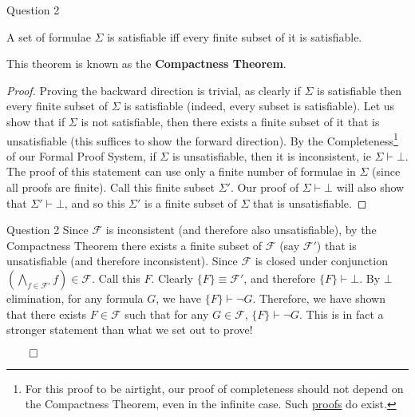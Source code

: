 \documentclass{beamer}
\begin{document}
    {
        \begin{frame}{Question 2}
            \vspace*{-4pt}
            \begin{theorem}
                A set of formulae $\Sigma$ is satisfiable iff every finite subset of it is satisfiable. 
            \end{theorem}
            \vspace*{-4pt}
            This theorem is known as the \textbf{Compactness Theorem}.
            \vspace*{-4pt}
            \begin{proof}
                Proving the backward direction is trivial, as clearly if $\Sigma$ is satisfiable then every finite subset of $\Sigma$ is satisfiable (indeed, every subset is satisfiable). Let us show that if $\Sigma$ is not satisfiable, then there exists a finite subset of it that is unsatisfiable (this suffices to show the forward direction). By the Completeness\footnote{For this proof to be airtight, our proof of completeness should not depend on the Compactness Theorem, even in the infinite case. Such \href{https://en.wikipedia.org/wiki/Propositional_calculus\#Sketch_of_completeness_proof}{proofs} do exist.} of our Formal Proof System, if $\Sigma$ is unsatisfiable, then it is inconsistent, ie $\Sigma \vdash \bot$. The proof of this statement can use only a finite number of formulae in $\Sigma$ (since all proofs are finite). Call this finite subset $\Sigma'$. Our proof of $\Sigma \vdash \bot$ will also show that $\Sigma' \vdash \bot$, and so this $\Sigma'$ is a finite subset of $\Sigma$ that is unsatisfiable.
            \end{proof}
        \end{frame}

        \begin{frame}{Question 2}
            Since $\mathcal{F}$ is inconsistent (and therefore also unsatisfiable), by the Compactness Theorem there exists a finite subset of $\mathcal{F}$ (say $\mathcal{F}'$) that is unsatisfiable (and therefore inconsistent). Since $\mathcal{F}$ is closed under conjunction $\left(\bigwedge\limits_{f \in \mathcal{F}'} f\right) \in \mathcal{F}$. Call this $F$. Clearly $\{F\} \equiv \mathcal{F}'$, and therefore $\{F\} \vdash \bot$. By $\bot$ elimination, for any formula $G$, we have $\{F\} \vdash \neg G$. Therefore, we have shown that there exists $F \in \mathcal{F}$ such that for any $G \in \mathcal{F}$, $\{F\} \vdash \neg G$. This is in fact a stronger statement than what we set out to prove!

            $\qed$
        \end{frame}
    }
\end{document}
